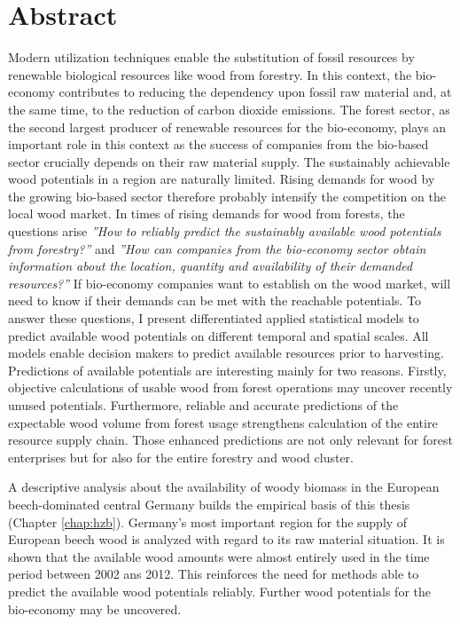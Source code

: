 \chapter*{Abstract}
\label{chap:Summary}
Modern utilization techniques enable the substitution of fossil resources by renewable biological resources like wood from forestry. In this context, the bio-economy contributes to reducing the dependency upon fossil raw material and, at the same time, to the reduction of carbon dioxide emissions. The forest sector, as the second largest producer of renewable resources for the bio-economy, plays an important role in this context as the success of companies from the bio-based sector crucially depends on their raw material supply. The sustainably achievable wood potentials in a region are naturally limited. Rising demands for wood by the growing bio-based sector therefore probably intensify the competition on the local wood market. In times of rising demands for wood from forests, the questions arise \textit{''How to reliably predict the sustainably available wood potentials from forestry?''} and \textit{''How can companies from the bio-economy sector obtain information about the location, quantity and availability of their demanded resources?''} If bio-economy companies want to establish on the wood market, will need to know if their demands can be met with the reachable potentials. To answer these questions, I present differentiated applied statistical models to predict available wood potentials on different temporal and spatial scales. All models enable decision makers to predict available resources prior to harvesting. Predictions of available potentials are interesting mainly for two reasons. Firstly, objective calculations of usable wood from forest operations may uncover recently unused potentials. Furthermore, reliable and accurate predictions of the expectable wood volume from forest usage strengthens calculation of the entire resource supply chain. Those enhanced predictions are not only relevant for forest enterprises but for also for the entire forestry and wood cluster.

A descriptive analysis about the availability of woody biomass in the European beech-dominated central Germany builds the empirical basis of this thesis (Chapter \ref{chap:hzb}). Germany's most important region for the supply of European beech wood is analyzed with regard to its raw material situation. It is shown that the available wood amounts were almost entirely used in the time period between 2002 ans 2012. This reinforces the need for methods able to predict the available wood potentials reliably. Further wood potentials for the bio-economy may be uncovered.

